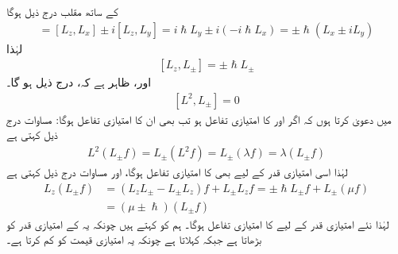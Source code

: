  کے ساتھ  مقلب درج ذیل ہوگا 
\begin{align*} 
[L_z, L_{\pm}] = [L_z, L_x] \pm i [L_z, L_y] = i \hslash L_y \pm i (- i \hslash L_x) = \pm \hslash (L_x \pm i L_y)
\end{align*}
لہٰذا 
\begin{align}\label{مساوات_تین_ابعادی_ایک_اور_سیڑھی}
[L_z, L_{\pm}] = \pm \hslash L_{\pm}
\end{align}
اور، ظاہر ہے کہ،  درج ذیل ہو گا۔ 
\begin{align}\label{مساوات_تین_ابعادی_مربع_اور_سیڑھی}
[L^2, L_{\pm}] = 0
\end{align}
میں  دعویٰ کرتا ہوں کہ اگر  اور  کا امتیازی تفاعل  ہو تب  بھی ان کا امتیازی تفاعل ہوگا:  مساوات  درج ذیل کہتی ہے 
\begin{align}
L^2 (L_{\pm} f) = L_{\pm} (L^2 f) = L_{\pm} (\lambda f) = \lambda (L_{\pm} f)
\end{align}
لہٰذا اسی امتیازی قدر  کے لیے  بھی  کا امتیازی تفاعل ہوگا، اور  مساوات  درج ذیل کہتی ہے  
\begin{align}
L_z (L_{\pm} f) &= (L_z L_{\pm} - L_{\pm} L_z) f + L_{\pm} L_z f = \pm \hslash L_\pm f + L_{\pm} (\mu f) \nonumber \\
&= (\mu \pm \hslash ) (L_{\pm} f)
\end{align}
لہٰذا نئے  امتیازی قدر  کے لیے    کا   امتیازی تفاعل ہوگا۔  ہم  کو  کہتے ہیں چونکہ یہ  کے امتیازی قدر کو   بڑھاتا ہے جبکہ   کہلاتا ہے چونکہ یہ امتیازی قیمت کو  کم کرتا ہے۔

